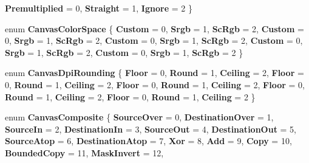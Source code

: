 \begin{DoxyCompactItemize}
{\bfseries Premultiplied} = 0, 
{\bfseries Straight} = 1, 
{\bfseries Ignore} = 2
 \}
\item 
\mbox{\label{namespace_microsoft_1_1_graphics_1_1_canvas_a968dbdb8c3779105d9af1ee42d19efa5}} 
enum {\bfseries Canvas\+Color\+Space} \{ \newline
{\bfseries Custom} = 0, 
{\bfseries Srgb} = 1, 
{\bfseries Sc\+Rgb} = 2, 
{\bfseries Custom} = 0, 
\newline
{\bfseries Srgb} = 1, 
{\bfseries Sc\+Rgb} = 2, 
{\bfseries Custom} = 0, 
{\bfseries Srgb} = 1, 
\newline
{\bfseries Sc\+Rgb} = 2, 
{\bfseries Custom} = 0, 
{\bfseries Srgb} = 1, 
{\bfseries Sc\+Rgb} = 2, 
\newline
{\bfseries Custom} = 0, 
{\bfseries Srgb} = 1, 
{\bfseries Sc\+Rgb} = 2
 \}
\item 
\mbox{\label{namespace_microsoft_1_1_graphics_1_1_canvas_aaf9bdf2614ae3a2c3978ef7522070d82}} 
enum {\bfseries Canvas\+Dpi\+Rounding} \{ \newline
{\bfseries Floor} = 0, 
{\bfseries Round} = 1, 
{\bfseries Ceiling} = 2, 
{\bfseries Floor} = 0, 
\newline
{\bfseries Round} = 1, 
{\bfseries Ceiling} = 2, 
{\bfseries Floor} = 0, 
{\bfseries Round} = 1, 
\newline
{\bfseries Ceiling} = 2, 
{\bfseries Floor} = 0, 
{\bfseries Round} = 1, 
{\bfseries Ceiling} = 2, 
\newline
{\bfseries Floor} = 0, 
{\bfseries Round} = 1, 
{\bfseries Ceiling} = 2
 \}
\item 
\mbox{\label{namespace_microsoft_1_1_graphics_1_1_canvas_ad4d6dae38d1a118a5742bdb597529f1e}} 
enum {\bfseries Canvas\+Composite} \{ \newline
{\bfseries Source\+Over} = 0, 
{\bfseries Destination\+Over} = 1, 
{\bfseries Source\+In} = 2, 
{\bfseries Destination\+In} = 3, 
\newline
{\bfseries Source\+Out} = 4, 
{\bfseries Destination\+Out} = 5, 
{\bfseries Source\+Atop} = 6, 
{\bfseries Destination\+Atop} = 7, 
\newline
{\bfseries Xor} = 8, 
{\bfseries Add} = 9, 
{\bfseries Copy} = 10, 
{\bfseries Bounded\+Copy} = 11, 
\newline
{\bfseries Mask\+Invert} = 12, 

\end{DoxyCompactItemize}

